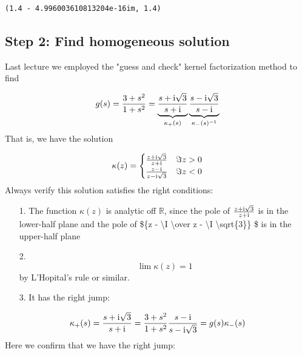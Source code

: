 \documentclass[12pt,a4paper]{article}
\def\I{ {\rm i} }
\def\R{ {\mathbb R} }
\begin{document}
\begin{lstlisting}
(1.4 - 4.996003610813204e-16im, 1.4)
\end{lstlisting}


\subsection{Step 2: Find homogeneous solution}
Last lecture we employed the "guess and check" kernel factorization method to find

\[
g(s) = {3 + s^2 \over 1 + s^2} = \underbrace{s + \I \sqrt{3} \over s + \I}_{\kappa_+(s)} 
\underbrace{s - \I \sqrt{3} \over s-\I }_{\kappa_-(s)^{-1}}
\]
That is, we have the solution

\[
\kappa(z) = \begin{cases} {z + \I \sqrt{3} \over z + \I}  & \Im z > 0 \\
                            {z - \I  \over z - \I \sqrt{3}} & \Im z < 0
                            \end{cases}
\]
Always verify this solution satisfies the right conditions:

\begin{itemize}
\item[1. ] The function $\kappa(z)$ is analytic off $\R$, since the pole of ${z + \I \sqrt{3} \over z + \I}$ is in the lower-half plane and the pole of \$\{z - {\textbackslash}I  {\textbackslash}over z - {\textbackslash}I {\textbackslash}sqrt\{3\}\} \$ is in the upper-half plane


\item[2. ] \[
\lim \kappa(z) = 1
\]
by L'Hopital's rule or similar.


\item[3. ] It has the right jump:

\end{itemize}
\[
\kappa_+(s) = {s + \I \sqrt{3} \over s + \I} = {3 + s^2 \over 1 + s^2}{s - \I  \over s - \I \sqrt{3}} = g(s)\kappa_-(s) 
\]
Here we confirm that we have the right jump:
\end{document}
